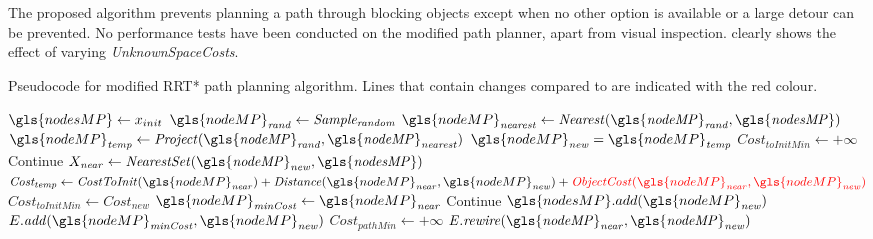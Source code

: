 The proposed algorithm prevents planning a path through blocking objects except when no other option is available or a large detour can be prevented. No performance tests have been conducted on the modified path planner, apart from visual inspection.  clearly shows the effect of varying \textit{UnknownSpaceCosts}.

\newpage
{}
\begin{algorithm}[H]
  \caption{Pseudocode for modified \ac{RRT*} path planning algorithm. Lines that contain changes compared to  are indicated with the red colour.}%
  \label{pseudocode:modified_proposed_rrt_star}
  \begin{algorithmic}[1]
    \State $\gls{nodesMP} \leftarrow x_{init}$
        \State $\gls{nodeMP}_\mathit{rand} \leftarrow \mathit{Sample_{random}}$ 
      \State $\gls{nodeMP}_\mathit{nearest} \leftarrow \mathit{Nearest(\gls{nodeMP}_{rand}, \gls{nodesMP})}$
      \State $\gls{nodeMP}_\mathit{temp} \leftarrow \mathit{Project(\gls{nodeMP}_{rand}, \gls{nodeMP}_{nearest})}$
      \State $\gls{nodeMP}_\mathit{new} = \gls{nodeMP}_\mathit{temp}$
      \State $\mathit{Cost_{toInitMin}} \leftarrow +\infty$ 
      \Else
      \State Continue
      \EndIf
      \State $X_\mathit{near} \leftarrow \mathit{NearestSet(\gls{nodeMP}_{new}, \gls{nodesMP})}$ 
    \State $\mathit{Cost_{temp}} \leftarrow \mathit{CostToInit}(\gls{nodeMP}_\mathit{near}) + \mathit{Distance}(\gls{nodeMP}_\mathit{near}, \gls{nodeMP}_\mathit{new}) + \textcolor{red}{\mathit{ObjectCost}(\gls{nodeMP}_\mathit{near}, \gls{nodeMP}_\mathit{new})}$
      \State $\mathit{Cost_{toInitMin}} \leftarrow \mathit{Cost_{new}}$
      \State $\gls{nodeMP}_\mathit{minCost} \leftarrow \gls{nodeMP}_\mathit{near}$
      \EndIf
      \EndFor
          \State Continue
      \Else
      \State $\gls{nodesMP}.add(\gls{nodeMP}_\mathit{new})$
      \State $E.\mathit{add}(\gls{nodeMP}_\mathit{minCost}, \gls{nodeMP}_\mathit{new})$
      \EndIf
      \State $\mathit{Cost_{pathMin}} \leftarrow +\infty$ 
      \State $\mathit{E.rewire(\gls{nodeMP}_{near}, \gls{nodeMP}_{new})}$
      \EndIf
      \Else {}


\end{algorithmic}
\end{algorithm}
